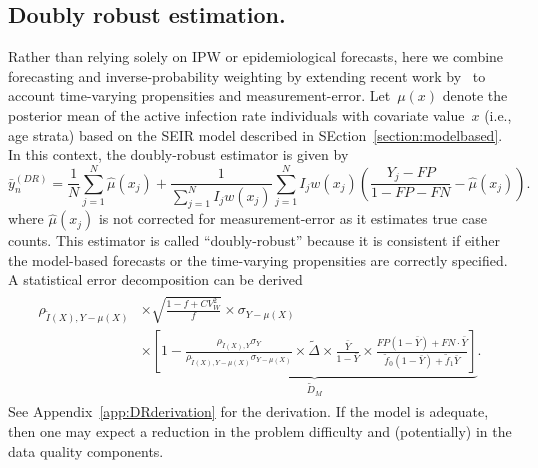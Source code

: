 \documentclass[11pt]{amsart}
\numberwithin{equation}{section}
\theoremstyle{plain}
\begin{document}


 \subsection{Doubly robust estimation.}
 Rather than relying solely on IPW or epidemiological forecasts, here we combine forecasting and inverse-probability weighting by extending recent work by~\cite{Chen2019} to account time-varying propensities and measurement-error.
 Let~$\mu(x)$ denote the posterior mean of the active infection rate individuals with covariate value~$x$ (i.e., age strata) based on the SEIR model described in SEction~\ref{section:modelbased}. In this context, the doubly-robust estimator is given by
 $$
 \bar y_{n}^{(DR)} = \frac{1}{N} \sum_{j=1}^N \hat \mu (x_j) + \frac{1}{\sum_{j=1}^N I_j w (x_j)} \sum_{j=1}^N I_j w(x_j) \left( \frac{Y_j - FP}{1 - FP - FN} - \hat \mu(x_j) \right).
 $$
 where $\hat \mu(x_j)$ is not corrected for measurement-error as it estimates true case counts. This estimator is called ``doubly-robust'' because it is consistent if either the model-based forecasts or the time-varying propensities are correctly specified. A statistical error decomposition can be derived
 \begin{align}
 \label{eq:statdecomp3}
 \begin{split}
 \rho_{\tilde I (X), Y-\mu(X)} &\times \sqrt{\frac{1-f+ CV^2_W}{f}} \times \sigma_{Y-\mu(X)}  \\
 &\times \underbrace{\left[ 1 - \frac{\rho_{\tilde I(X),Y} \sigma_{Y}}{\rho_{\tilde I(X),Y-\mu(X)} \sigma_{Y-\mu(X)}} \times \tilde \Delta \times \frac{\bar Y}{1-\bar Y} \times \frac{FP(1-\bar Y) + FN \cdot \bar Y}{\tilde f_0 (1-\bar Y) + \tilde f_1 \bar Y} \right]}_{\tilde D_M}.
 \end{split}
 \end{align}
 See Appendix~\ref{app:DRderivation} for the derivation.
 If the model is adequate, then one may expect a reduction in the problem difficulty and (potentially) in the data quality components.
\end{document}
